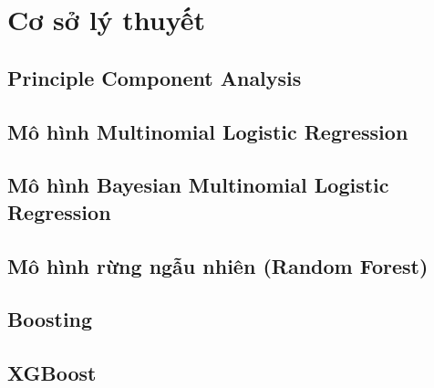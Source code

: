 \documentclass[14pt, a4paper]{article}
\numberwithin{equation}{section}
\numberwithin{figure}{section}
\theoremstyle{sltheorem}
\theoremstyle{soltheorem}
\begin{document}
    

    

    

    

    


\newpage
\printbibliography[title={TÀI LIỆU THAM KHẢO}]

\newpage

\appendix

\section{Cơ sở lý thuyết}

\subsection{Principle Component Analysis}



\subsection{Mô hình Multinomial Logistic Regression}



\subsection{ Mô hình Bayesian Multinomial Logistic Regression}



\subsection{Mô hình rừng ngẫu nhiên (Random Forest)}



\subsection{Boosting}
    


\subsection{XGBoost}
\end{document}

